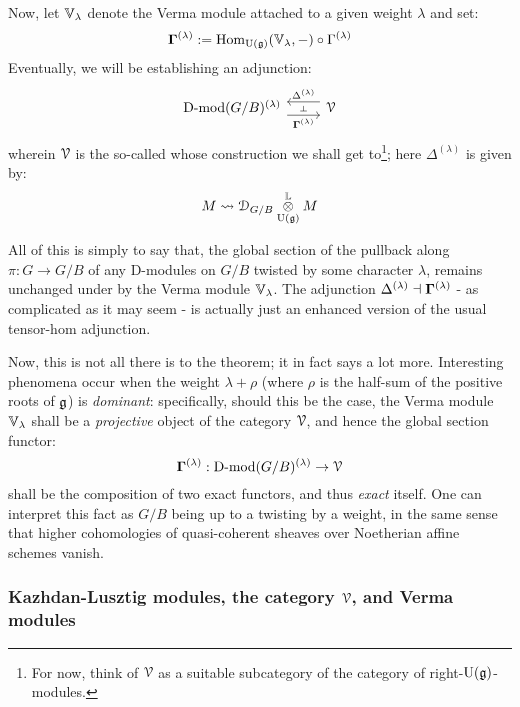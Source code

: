         Now, let $\mathbb{V}_{\lambda}$ denote the Verma module attached to a given weight $\lambda$ and set:
            $$\mathbf{\Gamma}^{(\lambda)} := \mathrm{Hom}_{\mathrm{U}(\mathfrak{g})}(\mathbb{V}_{\lambda}, -) \circ \Gamma^{(\lambda)}$$
        Eventually, we will be establishing an adjunction:
            $$
                \begin{tikzcd}
                	{\Dmod(G/B)^{(\lambda)}} & \calV
                	\arrow[""{name=0, anchor=center, inner sep=0}, "{\bfGamma^{(\lambda)}}"', shift right=2, from=1-1, to=1-2]
                	\arrow[""{name=1, anchor=center, inner sep=0}, "{\Delta^{(\lambda)}}"', shift right=2, from=1-2, to=1-1]
                	\arrow["\dashv"{anchor=center, rotate=-90}, draw=none, from=1, to=0]
                \end{tikzcd}
            $$
        wherein $\mathcal{V}$ is the so-called  whose construction we shall get to\footnote{For now, think of $\mathcal{V}$ as a suitable subcategory of the category of right-$\mathrm{U}(\mathfrak{g})$-modules.}; here $\Delta^{(\lambda)}$ is given by:
            $$M \mapsto \D_{G/B} \tensor^{\L}_{\U(\g)} M$$
            
        All of this is simply to say that, the global section of the pullback along $\pi: G \to G/B$ of any D-modules on $G/B$ twisted by some character $\lambda$, remains unchanged under  by the Verma module $\mathbb{V}_{\lambda}$. The adjunction $\Delta^{(\lambda)} \dashv \mathbf{\Gamma}^{(\lambda)}$ - as complicated as it may seem - is actually just an enhanced version of the usual tensor-hom adjunction.
        
        Now, this is not all there is to the theorem; it in fact says a lot more. Interesting phenomena occur when the weight $\lambda + \rho$ (where $\rho$ is the half-sum of the positive roots of $\mathfrak{g}$) is \textit{dominant}: specifically, should this be the case, the Verma module $\mathbb{V}_{\lambda}$ shall be a \textit{projective} object of the category $\mathcal{V}$, and hence the  global section functor:
            $$\mathbf{\Gamma}^{(\lambda)}: \mathrm{D}\text{-}\mathrm{mod}(G/B)^{(\lambda)} \to \mathcal{V}$$
        shall be the composition of two exact functors, and thus \textit{exact} itself. One can interpret this fact as $G/B$ being  up to a twisting by a weight, in the same sense that higher cohomologies of quasi-coherent sheaves over Noetherian affine schemes vanish. 
                
        \subsubsection{Kazhdan-Lusztig modules, the category \texorpdfstring{$\mathcal{V}$}{}, and Verma modules}
                
